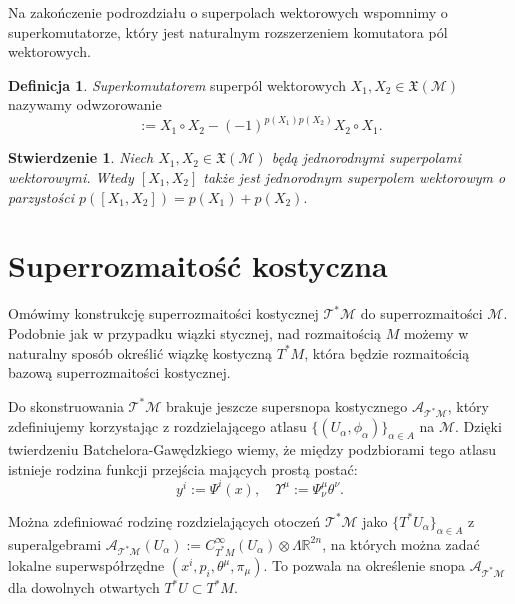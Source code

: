 \documentclass[11pt,a4paper]{report}
\newtheorem{proposition}[theorem]{Stwierdzenie}
\theoremstyle{definition}
\newtheorem{definition}[theorem]{Definicja}
\begin{document}
Na zakończenie podrozdziału o superpolach wektorowych wspomnimy o superkomutatorze, który jest naturalnym rozszerzeniem komutatora pól wektorowych.
		      			
\begin{definition}
	\textit{Superkomutatorem} superpól wektorowych $X_1, X_2 \in \mathfrak {X} (\mathcal{M})$ nazywamy odwzorowanie
	\begin{equation*}
		[X_1, X_2] := X_1 \circ X_2 - (-1)^{p(X_1) p(X_2)} X_2 \circ X_1.
	\end{equation*}
\end{definition}
		      			
\begin{proposition}
	Niech $X_1, X_2 \in \mathfrak {X} (\mathcal{M})$ będą jednorodnymi superpolami wektorowymi. Wtedy $[X_1, X_2]$ także jest jednorodnym superpolem wektorowym o parzystości $p([X_1, X_2]) = p(X_1) + p(X_2).$
\end{proposition}
		      			
\section{Superrozmaitość kostyczna}
		      			
Omówimy konstrukcję superrozmaitości kostycznej $\mathcal{T^*M}$ do superrozmaitości $\mathcal{M}$. Podobnie jak w przypadku wiązki stycznej, nad rozmaitością $M$ możemy w naturalny sposób określić wiązkę kostyczną $T^*M$, która będzie rozmaitością bazową superrozmaitości kostycznej.
		      			
Do skonstruowania $\mathcal{T^*M}$ brakuje jeszcze supersnopa kostycznego $\mathcal{A_{T^*M}}$, który zdefiniujemy korzystając z rozdzielającego atlasu $\{ (U_\alpha, \phi_\alpha ) \}_{\alpha \in A }$ na $\mathcal{M}$. Dzięki twierdzeniu Batchelora-Gawędzkiego wiemy, że między podzbiorami tego atlasu istnieje rodzina funkcji przejścia  mających prostą postać:
\begin{equation*}
	y^i := \Psi^i (x), \quad \Upsilon^\mu := \Psi^\mu_\nu \theta^\nu.
\end{equation*}
		      			
Można zdefiniować rodzinę rozdzielających otoczeń $\mathcal{T^*M}$ jako $\{ T^*U_\alpha \}_{\alpha \in A}$ z superalgebrami $\mathcal{A_{T^*M}}(U_\alpha) := C^\infty_{T^*M}(U_\alpha) \otimes \Lambda \mathbb{R}^{2n}$, na których można zadać lokalne superwspółrzędne $(x^i, p_i, \theta^\mu, \pi_\mu)$. To pozwala na określenie snopa $\mathcal{A_{T^*M}}$ dla dowolnych otwartych $T^*U \subset T^*M.$
		      			
\end{document}
